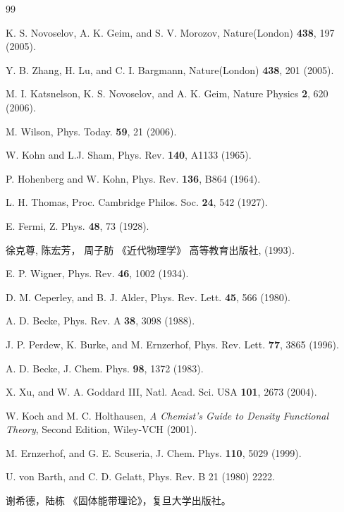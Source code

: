 {\small  \begin{thebibliography} {99} \parskip=-1mm 
\fancyhf{} 
 \fancyfoot[CO,CE]
{\bf---$\quad$\thepage $\quad$---} 

K. S. Novoselov, A. K. Geim, and S. V. Morozov,
Nature(London) {\bf 438}, 197 (2005).

Y. B. Zhang, H. Lu, and C. I. Bargmann,
Nature(London) {\bf 438}, 201 (2005).

M. I. Katsnelson, K. S. Novoselov, and A. K. Geim,
Nature Physics {\bf 2}, 620 (2006).

M. Wilson, 
Phys. Today. {\bf 59}, 21 (2006).

W. Kohn and L.J. Sham,
Phys. Rev. {\bf 140}, A1133 (1965).

P. Hohenberg and W. Kohn,
Phys. Rev. {\bf 136}, B864 (1964).

L. H. Thomas,
 Proc. Cambridge Philos. Soc. {\bf 24}, 542 (1927).
 
E. Fermi,
Z. Phys. {\bf 48}, 73 (1928).

徐克尊, 陈宏芳， 周子肪 《近代物理学》 高等教育出版社, (1993).

E. P. Wigner,
Phys. Rev. {\bf 46}, 1002 (1934).

D. M. Ceperley, and B. J. Alder,
Phys. Rev. Lett. {\bf 45}, 566 (1980).

A. D. Becke,
Phys. Rev. A {\bf 38}, 3098 (1988).

J. P. Perdew, K. Burke, and M. Ernzerhof,
Phys. Rev. Lett. {\bf 77}, 3865 (1996).

A. D. Becke,
J. Chem. Phys. {\bf 98}, 1372 (1983).

X. Xu, and W. A. Goddard III,
Natl. Acad. Sci. USA {\bf 101}, 2673 (2004).

W. Koch and M. C. Holthausen, \emph{A Chemist’s Guide to Density Functional Theory}, Second Edition, Wiley-VCH (2001).

M. Ernzerhof, and G. E. Scuseria, 
J. Chem. Phys. {\bf 110}, 5029 (1999).

U. von Barth, and C. D. Gelatt, Phys. Rev. B 21 (1980) 2222.

谢希德，陆栋 《固体能带理论》，复旦大学出版社。


\end{thebibliography}}
